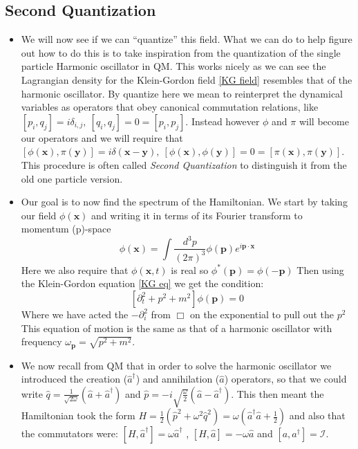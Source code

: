 \documentclass[11pt]{article}
\numberwithin{equation}{section}
\begin{document}
\subsection{Second Quantization}
\begin{itemize}
  \item We will now see if we can ``quantize'' this field. What we can do to help figure out how to do this is to take inspiration from the quantization of the single particle Harmonic oscillator in QM. This works nicely as we can see the Lagrangian density for the Klein-Gordon field \ref{KG field} resembles that of the harmonic oscillator. By quantize here we mean to reinterpret the dynamical variables as operators that obey canonical commutation relations, like $[p_i,q_j] = i\delta_{i,j},~[q_i,q_j] = 0 = [p_i,p_j]$. Instead however $\phi$ and $\pi$ will become our operators and we will require that $[\phi(\textbf{x}),\pi(\textbf{y})] = i \delta(\textbf{x}-\textbf{y}),~ [\phi(\textbf{x}),\phi(\textbf{y})] = 0 = [\pi(\textbf{x}),\pi(\textbf{y})]$. This procedure is often called \emph{Second Quantization} to distinguish it from the old one particle version. 
  
  \item Our goal is to now find the spectrum of the Hamiltonian. We start by taking our field $\phi(\textbf{x})$ and writing it in terms of its Fourier transform to momentum (p)-space
\[
  \phi(\textbf{x}) = \int \frac{d^3p}{(2\pi)^3}\phi(\textbf{p})e^{i\textbf{p}\cdot\textbf{x}}
\]
Here we also require that $\phi(\textbf{x},t)$ is real so $\phi^{\ast}(\textbf{p}) = \phi(-\textbf{p})$ Then using the Klein-Gordon equation \ref{KG eq} we get the condition:
\[
  \left[\partial_t^2 + p^2+m^2\right]\phi(\textbf{p}) = 0 
\]
Where we have acted the $-\partial^2_{i}$ from $\Box$ on the exponential to pull out the $p^2$ This equation of motion is the same as that of a harmonic oscillator with frequency $\omega_{\textbf{p}} = \sqrt{p^2+m^2}$. 

\item We now recall from QM that in order to solve the harmonic oscillator we introduced the creation ($\hat{a}^{\dagger}$) and annihilation ($\hat{a}$) operators, so that we could write $\hat{q} = \frac{1}{\sqrt{2 \omega}}(\hat{a}+\hat{a}^{\dagger})$ and $\hat{p} = -i\sqrt{\frac{\omega}{2}}(\hat{a}-\hat{a}^{\dagger})$. This then meant the Hamiltonian took the form $H = \frac{1}{2}(\hat{p}^2+\omega^2\hat{q}^2) = \omega(\hat{a}^{\dagger}\hat{a}+\frac{1}{2})$ and also that the commutators  were: $[H,\hat{a}^{\dagger}] = \omega \hat{a}^{\dagger}$ , $[H,\hat{a}] = -\omega \hat{a}$ and $[a,a^{\dagger}] =\mathcal{I}$. 
 

\end{itemize}
\end{document}
